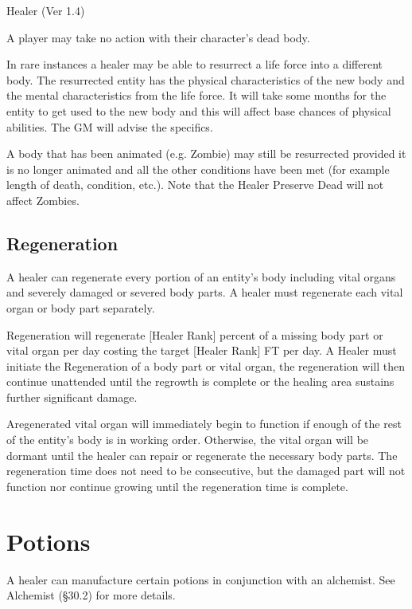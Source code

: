 \begin{Chapter}{Healer (Ver 1.4)}
\begin{Itemize}
\item A player may take no action with their character’s dead body.

\item In rare instances a healer may be able to resurrect a life force
  into a different body.  The resurrected entity has the physical
  characteristics of the new body and the mental characteristics from
  the life force. It will take some months for the entity to get used
  to the new body and this will affect base chances of physical
  abilities.  The GM will advise the specifics.

\item A body that has been animated (e.g.  Zombie) may still be
  resurrected provided it is no longer animated and all the other
  conditions have been met (for example length of death, condition,
  etc.).  Note that the Healer Preserve Dead will not affect Zombies.
\end{Itemize}

\subsection{Regeneration}

A healer can regenerate every portion of an entity’s body including
vital organs and severely damaged or severed body parts.  A healer
must regenerate each vital organ or body part separately.

Regeneration will regenerate [Healer Rank] percent of a missing body
part or vital organ per day costing the target [Healer Rank] FT per
day.  A Healer must initiate the Regeneration of a body part or vital
organ, the regeneration will then continue unattended until the
regrowth is complete or the healing area sustains further significant
damage.

Aregenerated vital organ will immediately begin to function if enough
of the rest of the entity’s body is in working order.  Otherwise, the
vital organ will be dormant until the healer can repair or regenerate
the necessary body parts. The regeneration time does not need to be
consecutive, but the damaged part will not function nor continue
growing until the regeneration time is complete.

\section{Potions}

A healer can manufacture certain potions in conjunction with an
alchemist.  See Alchemist (§30.2) for more details.


\end{Chapter}
